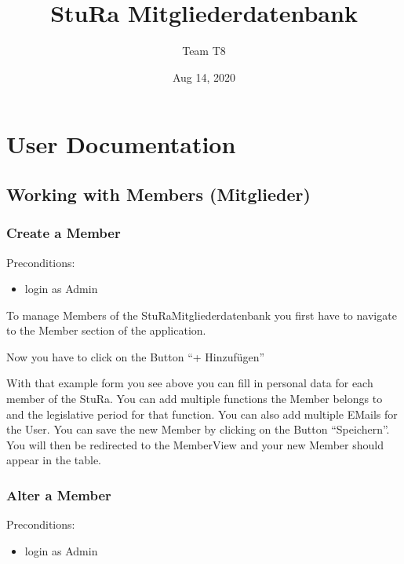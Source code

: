 \documentclass[letterpaper,10pt,english]{sphinxmanual}
\title{StuRa \sphinxhyphen{} Mitgliederdatenbank}
\date{Aug 14, 2020}
\author{Team T8}
\begin{document}
\pagestyle{empty}
\sphinxmaketitle
\pagestyle{plain}
\sphinxtableofcontents
\pagestyle{normal}
\label{\detokenize{index::doc}}



\chapter{User Documentation}
\label{\detokenize{masterUserDoc:user-documentation}}\label{\detokenize{masterUserDoc::doc}}

\section{Working with Members (Mitglieder)}
\label{\detokenize{masterUserDoc:working-with-members-mitglieder}}

\subsection{Create a Member}
\label{\detokenize{masterUserDoc:create-a-member}}
Pre\sphinxhyphen{}conditions:
\begin{itemize}
\item {} 
login as Admin

\end{itemize}

To manage Members of the StuRa\sphinxhyphen{}Mitgliederdatenbank you first have to navigate
to the Member section of the application.

\noindent{}

Now you have to click on the Button “+ Hinzufügen”

\noindent{}

\noindent{}

With that example form you see above you can fill in personal data for
each member of the StuRa. You can add multiple functions the Member belongs to
and the legislative period for that function. You can also add multiple
E\sphinxhyphen{}Mails for the User. You can save the new Member by clicking on the Button
“Speichern”. You will then be redirected to the Member\sphinxhyphen{}View and your
new Member should appear in the table.


\subsection{Alter a Member}
\label{\detokenize{masterUserDoc:alter-a-member}}
Pre\sphinxhyphen{}conditions:
\begin{itemize}
\item {} 
login as Admin

\end{itemize}
\end{document}

